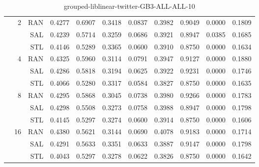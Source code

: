 \begin{center}
\begin{table}[htbp]
\begin{tabular}{ | r | r | r | r | r | r | r | r | r | r | r |}
 & \multirow{3}{*}{2} & RAN & 0.4277 & 0.6907 & 0.3418 & 0.0837 & 0.3982 & 0.9049 & 0.0000 & 0.1809\\ \cline{3-11}
 &   & SAL & 0.4239 & 0.5714 & 0.3259 & 0.0686 & 0.3921 & 0.8947 & 0.0385 & 0.1685\\ \cline{3-11}
 &   & STL & 0.4146 & 0.5289 & 0.3365 & 0.0600 & 0.3910 & 0.8750 & 0.0000 & 0.1634\\ \cline{2-11}
 & \multirow{3}{*}{4} & RAN & 0.4325 & 0.5960 & 0.3114 & 0.0791 & 0.3947 & 0.9127 & 0.0000 & 0.1880\\ \cline{3-11}
 &   & SAL & 0.4286 & 0.5818 & 0.3194 & 0.0625 & 0.3922 & 0.9231 & 0.0000 & 0.1746\\ \cline{3-11}
 &   & STL & 0.4066 & 0.5280 & 0.3317 & 0.0584 & 0.3827 & 0.8750 & 0.0000 & 0.1635\\ \cline{2-11}
 & \multirow{3}{*}{8} & RAN & 0.4295 & 0.5868 & 0.3045 & 0.0738 & 0.3980 & 0.9266 & 0.0000 & 0.1783\\ \cline{3-11}
 &   & SAL & 0.4298 & 0.5508 & 0.3273 & 0.0758 & 0.3988 & 0.8947 & 0.0000 & 0.1798\\ \cline{3-11}
 &   & STL & 0.4145 & 0.5297 & 0.3274 & 0.0600 & 0.3914 & 0.8750 & 0.0000 & 0.1606\\ \cline{2-11}
 & \multirow{3}{*}{16} & RAN & 0.4380 & 0.5621 & 0.3144 & 0.0690 & 0.4078 & 0.9183 & 0.0000 & 0.1714\\ \cline{3-11}
 &   & SAL & 0.4291 & 0.5633 & 0.3351 & 0.0633 & 0.3887 & 0.9147 & 0.0000 & 0.1798\\ \cline{3-11}
 &   & STL & 0.4043 & 0.5297 & 0.3278 & 0.0622 & 0.3826 & 0.8750 & 0.0000 & 0.1642\\ \cline{2-11}
\hline
\end{tabular}
\caption{grouped-liblinear-twitter-GB3-ALL-ALL-10}
\end{table}
\end{center}

